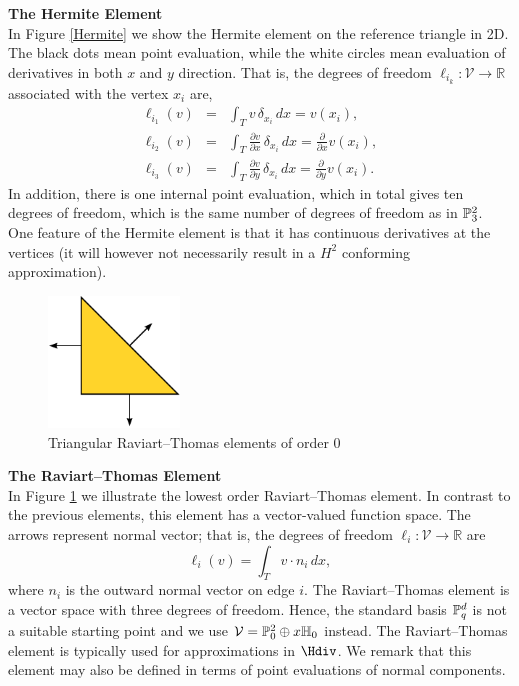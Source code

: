 \begin{example}{\bf{ The Hermite Element}} \\
In Figure \ref{Hermite} we show the Hermite element on the reference
triangle in 2D. The black dots mean point evaluation, while the white
circles mean evaluation of derivatives in both $x$ and $y$ direction.
That is, the degrees of freedom $\ell_{i_k} : \mathcal{V} \rightarrow
\mathbb{R}$ associated with the vertex $x_i$ are,
\begin{eqnarray}
\ell_{i_1} ( v) &=& \int_{T} {v} \, \delta_{x_i} \, dx = v(x_i),    \\
\ell_{i_2} ( v) &=& \int_{T} \frac{\partial{v}}{\partial x} \, \delta_{x_i} \, dx = \frac{\partial}{\partial x} v(x_i),  \\
\ell_{i_3} ( v) &=& \int_{T} \frac{\partial{v}}{\partial y} \, \delta_{x_i} \, dx = \frac{\partial}{\partial y} v(x_i) .
\end{eqnarray}
In addition, there is one internal point evaluation, which in total gives
ten degrees of freedom, which is the same number of degrees of freedom as
in $\P^2_3$.  One feature of the Hermite element is that it has continuous
derivatives at the vertices (it will however not necessarily result in
a $H^2$ conforming approximation).
\end{example}

\begin{figure}
  \begin{center}
    \includegraphics[height=3.5cm]{chapters/kirby-6/pdf/RT0.pdf}
    \caption{Triangular Raviart--Thomas elements of order 0}
    \label{Raviart-Thomas}
  \end{center}
\end{figure}

\begin{example}{\bf{The Raviart--Thomas Element}} \\
In Figure \ref{Raviart-Thomas} we illustrate the lowest order
Raviart--Thomas element.  In contrast to the previous elements, this
element has a vector-valued function space.  The arrows represent normal
vector; that is, the degrees of freedom $\ell_i : \mathcal{V} \rightarrow
\mathbb{R}$ are
\begin{equation}
\ell_i ( v) = \int_{T} v \cdot n_i  \, dx ,
\end{equation}
where $n_i$ is the outward normal vector on edge $i$.  The Raviart--Thomas
element is a vector space with three degrees of freedom. Hence, the
standard basis $\P^d_q$ is not a suitable starting point and we use
$\mathcal{V} = \P_0^2 \oplus x \H_0$ instead.  The Raviart--Thomas
element is typically used for approximations in $\Hdiv$.  We remark
that this element may also be defined in terms of point evaluations of
normal components.
\end{example}

